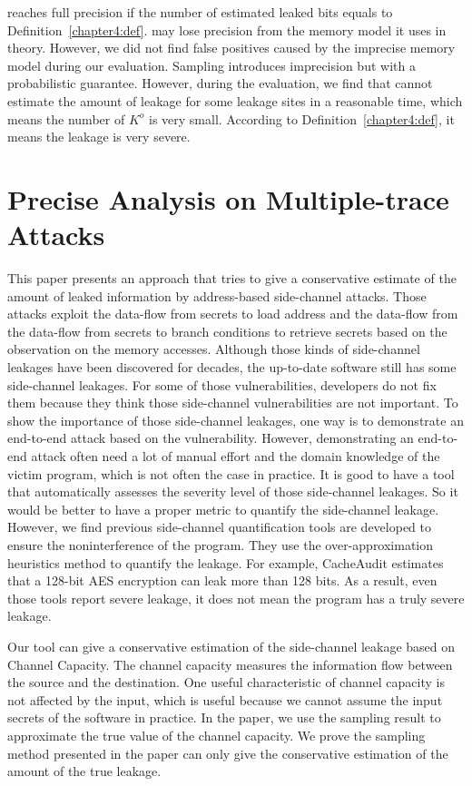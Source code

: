 \tool{} reaches full precision if the number of estimated leaked bits
equals to Definition~\ref{chapter4:def}.
\tool{} may lose precision from the
memory model it uses in theory. However, we did not find false positives
caused by the imprecise memory model during our evaluation.
Sampling introduces imprecision but with a probabilistic guarantee.
However, during the evaluation, we find that \tool{} cannot estimate
the amount of leakage for some leakage sites in a reasonable time,
which means the number of $K^o$ is very small. According to Definition~\ref{chapter4:def}, it means the leakage is very severe. 
\section{Precise Analysis on Multiple-trace Attacks}
This paper presents an approach that tries to give a conservative
estimate of the amount of leaked information by address-based
side-channel attacks. Those attacks exploit the data-flow from secrets
to load address and the data-flow from the data-flow from secrets to
branch conditions to retrieve secrets based on the observation on the
memory accesses. Although those kinds of side-channel leakages have
been discovered for decades, the up-to-date software still has some
side-channel leakages. For some of those vulnerabilities, developers
do not fix them because they think those side-channel vulnerabilities
are not important. To show the importance of those side-channel
leakages, one way is to demonstrate an end-to-end attack based on the
vulnerability. However, demonstrating an end-to-end attack often need
a lot of manual effort and the domain knowledge of the victim program,
which is not often the case in practice. It is good to have a tool
that automatically assesses the severity level of those side-channel
leakages. So it would be better to have a proper metric to quantify
the side-channel leakage. However, we find previous side-channel
quantification tools are developed to ensure the noninterference of
the program. They use the over-approximation heuristics method to
quantify the leakage. For example, CacheAudit estimates that a 128-bit
AES encryption can leak more than 128 bits. As a result, even those
tools report severe leakage, it does not mean the program has a truly
severe leakage.

Our tool can give a conservative estimation of the
side-channel leakage based on Channel Capacity. The channel capacity
measures the information flow between the source and the
destination. One useful characteristic of channel capacity is not
affected by the input, which is useful because we cannot
assume the input secrets of the software in practice. In the paper, we
use the sampling result to approximate the true value of the
channel capacity. We prove the sampling method presented in the paper can only give the conservative estimation of the amount of the true leakage.

